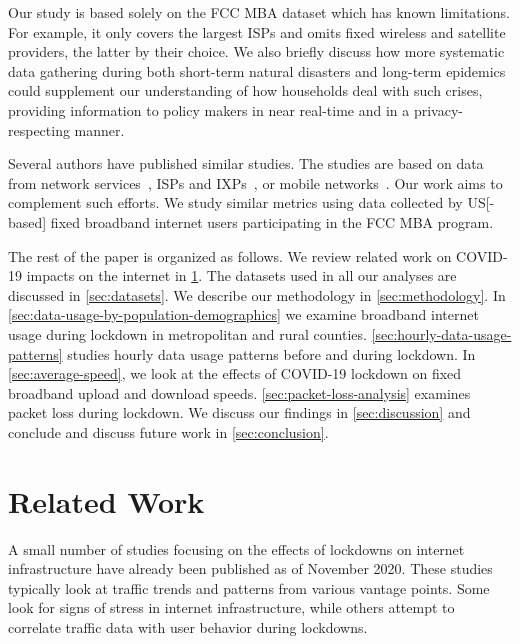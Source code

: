 \documentclass[conference,10pt]{IEEEtran}
\begin{document}
Our study is based solely on the \gls{FCC} \gls{MBA} dataset which has known limitations. For example, it only covers the largest \glspl{ISP} and omits fixed wireless and satellite providers, the latter by their choice. We also briefly discuss how more systematic data gathering during both short-term natural disasters and long-term epidemics could supplement our understanding of how households deal with such crises, providing information to policy makers in near real-time and in a privacy-respecting manner.

Several authors have published similar studies. The studies are based on data from network services~\cite{bottger2020internet,akamai,facebook}, \glspl{ISP} and \glspl{IXP}~\cite{feldmann2020lockdown,liu2020characterizing}, or mobile networks~\cite{lutu2020characterization}. Our work aims to complement such efforts. We study similar metrics using data collected by \gls{US}[-based] fixed broadband internet users participating in the \gls{FCC} \gls{MBA} program.

The rest of the paper is organized as follows. We review related work on COVID-19 impacts on the internet in \cref{sec:related-work}. The datasets used in all our analyses are discussed in \cref{sec:datasets}. We describe our methodology in \cref{sec:methodology}. In \cref{sec:data-usage-by-population-demographics} we examine broadband internet usage during lockdown in metropolitan and rural counties. \cref{sec:hourly-data-usage-patterns} studies hourly data usage patterns before and during lockdown. In \cref{sec:average-speed}, we look at the effects of COVID-19 lockdown on fixed broadband upload and download speeds. \cref{sec:packet-loss-analysis} examines packet loss during lockdown. We discuss our findings in \cref{sec:discussion} and conclude and discuss future work in \cref{sec:conclusion}.

\section{Related Work}\label{sec:related-work}



A small number of studies focusing on the effects of lockdowns on internet infrastructure have already been published as of November 2020. These studies typically look at traffic trends and patterns from various vantage points. Some look for signs of stress in internet infrastructure, while others attempt to correlate traffic data with user behavior during lockdowns.
\end{document}
